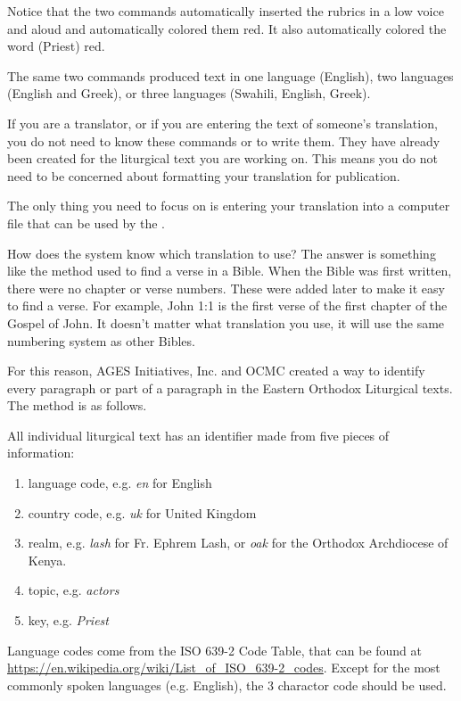 \documentclass[]{memoir}
\begin{document}
Notice that the two commands automatically inserted the rubrics \color{red}in a low voice \color{black}and \color{red}aloud \color{black} and automatically colored them red.  It also automatically colored the word \color{red}(Priest) \color{black}red.

The same two commands produced text in one language (English), two languages (English and Greek), or three languages (Swahili, English, Greek).

If you are a translator, or if you are entering the text of someone's translation, you do not need to know these commands or to write them.  They have already been created for the liturgical text you are working on.  This means you do not need to be concerned about formatting your translation for publication.

The only thing you need to focus on is entering your translation into a computer file that can be used by the \ltOcmcSystem.

How does the system know which translation to use?  The answer is something like the method used to find a verse in a Bible.  When the Bible was first written, there were no chapter or verse numbers.  These were added later to make it easy to find a verse.  For example, John 1:1 is the first verse of the first chapter of the Gospel of John.  It doesn't matter what translation you use, it will use the same numbering system as other Bibles.

For this reason, AGES Initiatives, Inc. and OCMC created a way to identify every paragraph or part of a paragraph in the Eastern Orthodox Liturgical texts.  The method is as follows.

All individual liturgical text has an identifier made from five pieces of information:

\begin{enumerate}
    \item language code, e.g. \emph{en} for English
    \item country code, e.g. \emph{uk} for United Kingdom
    \item realm, e.g. \emph{lash} for Fr. Ephrem Lash, or \emph{oak} for the Orthodox Archdiocese of Kenya.
    \item topic, e.g. \emph{actors}
    \item key, e.g. \emph{Priest}
\end{enumerate}

\begin{boxed}
Language codes come from the ISO 639-2 Code Table, that can be found at \url{https://en.wikipedia.org/wiki/List_of_ISO_639-2_codes}.  Except for the most commonly spoken languages (e.g. English), the 3 charactor code should be used.
\end{boxed}
\end{document}
